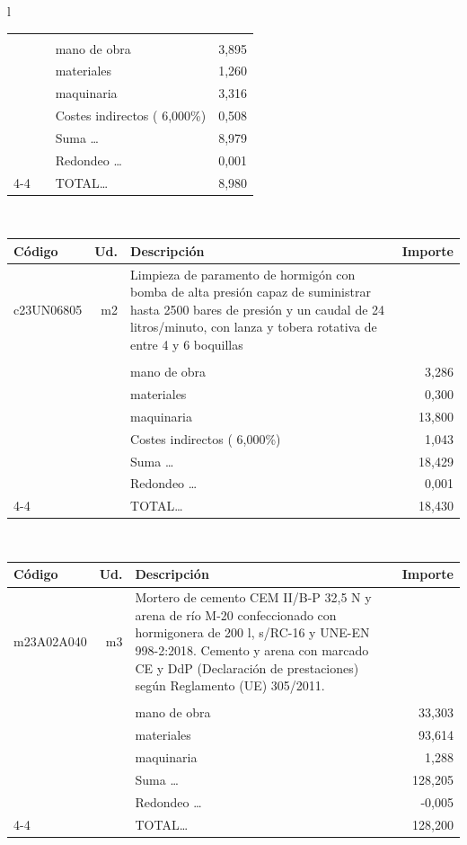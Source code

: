\documentclass{book}%
\begin{document}
\begin{longtable}{l}
\begin{tabular}{l r p{60mm} r}
&&&\\%
&&mano de obra&     3,895\\%
&&materiales&     1,260\\%
&&maquinaria&     3,316\\%
&&Costes indirectos (     6,000\%)&     0,508\\%
&&Suma \ldots&     8,979\\%
&&Redondeo \ldots&     0,001\\%
\cline{4-4}%
&&TOTAL\ldots&     8,980\\%
\end{tabular}\\%
\begin{tabular}{l r p{60mm} r}%
Código&Ud.&Descripción&Importe\\%
\hline%
c23UN06805&m2&Limpieza de paramento de hormigón con bomba de alta presión capaz de suministrar hasta 2500 bares de presión y un caudal de 24 litros/minuto, con lanza y tobera rotativa de entre 4 y 6 boquillas&\\%
&&&\\%
&&mano de obra&     3,286\\%
&&materiales&     0,300\\%
&&maquinaria&    13,800\\%
&&Costes indirectos (     6,000\%)&     1,043\\%
&&Suma \ldots&    18,429\\%
&&Redondeo \ldots&     0,001\\%
\cline{4-4}%
&&TOTAL\ldots&    18,430\\%
\end{tabular}\\%
\begin{tabular}{l r p{60mm} r}%
Código&Ud.&Descripción&Importe\\%
\hline%
m23A02A040&m3&Mortero de cemento CEM II/B{-}P 32,5 N y arena de río M{-}20 confeccionado con hormigonera de 200 l, s/RC{-}16 y UNE{-}EN 998{-}2:2018. Cemento y arena con marcado CE y DdP (Declaración de prestaciones) según Reglamento (UE) 305/2011.&\\%
&&&\\%
&&mano de obra&    33,303\\%
&&materiales&    93,614\\%
&&maquinaria&     1,288\\%
&&Suma \ldots&   128,205\\%
&&Redondeo \ldots&    {-}0,005\\%
\cline{4-4}%
&&TOTAL\ldots&   128,200\\%

\end{tabular}
\end{longtable}
\end{document}
